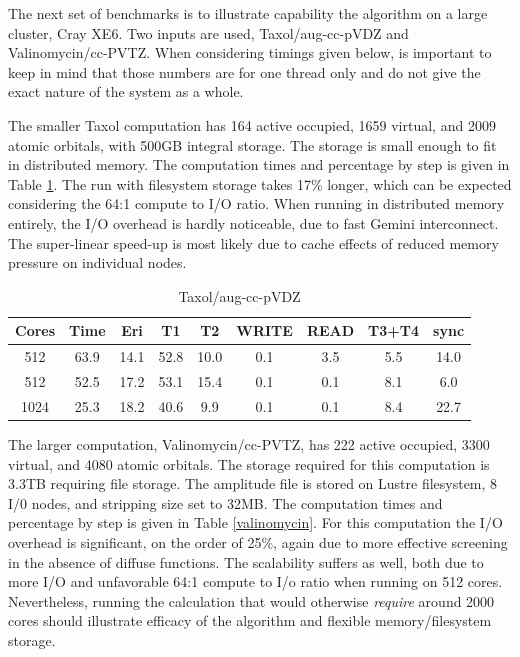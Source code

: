 \documentclass[12pt]{article} \usepackage[margin=1in]{geometry}
\begin{document}
The next set of benchmarks is to illustrate capability the algorithm
on a large cluster, Cray XE6.  Two inputs are used, Taxol/aug-cc-pVDZ
and Valinomycin/cc-PVTZ.  When considering timings given below, is
important to keep in mind that those numbers are for one thread only
and do not give the exact nature of the system as a whole.

The smaller Taxol computation has 164 active occupied, 1659 virtual,
and 2009 atomic orbitals, with 500GB integral storage.  The storage is
small enough to fit in distributed memory.  The computation times and
percentage by step is given in Table \ref {taxol}.  The run with
filesystem storage takes 17\% longer, which can be expected
considering the 64:1 compute to I/O ratio.  When running in
distributed memory entirely, the I/O overhead is hardly noticeable,
due to fast Gemini interconnect.  The super-linear speed-up is most
likely due to cache effects of reduced memory pressure on individual
nodes.

\begin{table}
  \label{taxol}
  \caption {Taxol/aug-cc-pVDZ}
  \begin{center}
    \begin{tabular}{| c | c | c | c | c | c | c | c | c |}
      \hline
      Cores & Time & Eri   & T1    & T2   & WRITE & READ & T3+T4 & sync \\ 
      \hline 
      512 & 63.9 & 14.1 & 52.8 & 10.0 & 0.1 & 3.5 & 5.5 & 14.0 \\
      512 & 52.5 & 17.2 & 53.1 & 15.4 & 0.1 & 0.1 & 8.1 & 6.0 \\
     1024 & 25.3 & 18.2 & 40.6 & 9.9  & 0.1 & 0.1 & 8.4 & 22.7 \\
      \hline
    \end{tabular}
  \end{center}
\end{table}


The larger computation, Valinomycin/cc-PVTZ, has 222 active occupied,
3300 virtual, and 4080 atomic orbitals.  The storage required for this
computation is 3.3TB requiring file storage.  The amplitude file is
stored on Lustre filesystem, 8 I/0 nodes, and stripping size set to
32MB.  The computation times and percentage by step is given in Table
\ref {valinomycin}.  For this computation the I/O overhead is
significant, on the order of 25\%, again due to more effective
screening in the absence of diffuse functions.  The scalability
suffers as well, both due to more I/O and unfavorable 64:1 compute to
I/o ratio when running on 512 cores.  Nevertheless, running the
calculation that would otherwise {\it require} around 2000 cores should
illustrate efficacy of the algorithm and flexible memory/filesystem
storage.
\end{document}
